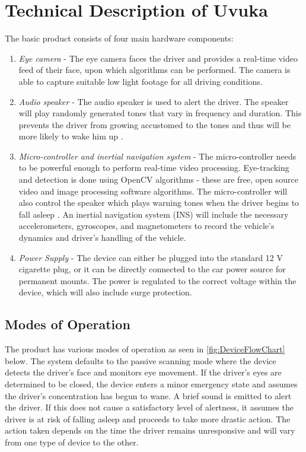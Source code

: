 \section{Technical Description of Uvuka}
\label{sec:Technical description of Uvuka}
The basic product consists of four main hardware components:
\begin{enumerate}
  \item \textit{Eye camera} - The eye camera faces the driver and provides a real-time video feed of their face, upon which algorithms can be performed. The camera is able to capture suitable low light footage for all driving conditions.
  \item \textit{Audio speaker} - The audio speaker is used to alert the driver. The speaker will play randomly generated tones that vary in frequency and duration. This prevents the driver from growing accustomed to the tones and thus will be more likely to wake him up \cite{Habituation}.
  \item \textit{Micro-controller and inertial navigation system} - The micro-controller needs to be powerful enough to perform real-time video processing. Eye-tracking and detection is done using OpenCV algorithms - these are free, open source video and image processing software algorithms. The micro-controller will also control the speaker which plays warning tones when the driver begins to fall asleep \cite{OpenCV}. An inertial navigation system (INS) will include the necessary accelerometers, gyroscopes, and magnetometers to record the vehicle's dynamics and driver's handling of the vehicle.
  \item \textit{Power Supply} - The device can either be plugged into the standard 12 V cigarette plug, or it can be directly connected to the car power source for permanent mounts. The power is regulated to the correct voltage within the device, which will also include surge protection.
\end{enumerate}

\newpage 
\subsection{Modes of Operation}
The product has various modes of operation as seen in \cref{fig:DeviceFlowChart} below. The system defaults to the passive scanning mode where the device detects the driver's face and monitors eye movement. If the driver's eyes are determined to be closed, the device  enters a minor emergency state and assumes the driver's concentration has begun to wane. A brief sound is emitted to alert the driver. If this does not cause a satisfactory level of alertness, it assumes the driver is at risk of falling asleep and proceeds to take more drastic action. The action taken depends on the time the driver remains unresponsive and will vary from one type of device to the other.

